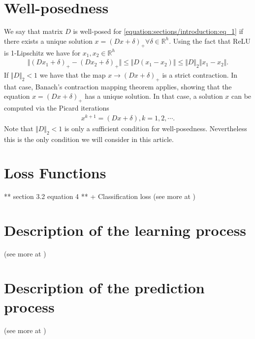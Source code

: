 \documentclass[letterpaper,10pt,english]{sphinxmanual}
\begin{document}
\section{Well-posedness}
\label{\detokenize{sections/introduction:well-posedness}}
We say that matrix \(D\) is well-posed for \eqref{equation:sections/introduction:eq_1} if there exists a unique solution \(x = (Dx + \delta)_+ \forall \delta \in \mathbb{R}^h\).
Using the fact that ReLU is 1-Lipschitz we have for \(x_1,x_2 \in \mathbb{R}^h\)
\begin{equation*}
\begin{split}\Vert (Dx_1 + \delta)_+ - (Dx_2 + \delta)_+ \Vert \leq \Vert D(x_1 -x_2) \Vert \leq \Vert D \Vert_2 \Vert x_1 -x_2 \Vert.\end{split}
\end{equation*}
If \(\Vert D \Vert_2 < 1\) we have that the map \(x \rightarrow (Dx + \delta)_+\) is a strict contraction. In that case, Banach’s contraction
mapping theorem applies, showing that the equation \(x = (Dx + \delta)_+\) has a unique solution. In that case, a solution \(x\) can be computed via the
Picard iterations
\begin{equation*}
\begin{split}x^{k+1} = (Dx + \delta), k = 1,2, \cdots.\end{split}
\end{equation*}
Note that \(\Vert D \Vert_2 < 1\) is only a sufficient condition for well-posedness. Nevertheless this is the only condition
we will consider in this article.


\section{Loss Functions}
\label{\detokenize{sections/introduction:loss-functions}}
** section 3.2 equation 4 ** + Classification loss
(see more at {\hyperref[\detokenize{sections/learning:learning}]{}})


\section{Description of the learning process}
\label{\detokenize{sections/introduction:description-of-the-learning-process}}
(see more at {\hyperref[\detokenize{sections/bi_convex_formulation:formulation}]{}})


\section{Description of the prediction process}
\label{\detokenize{sections/introduction:description-of-the-prediction-process}}
(see more at {\hyperref[\detokenize{sections/prediction:prediction}]{}})
\end{document}
